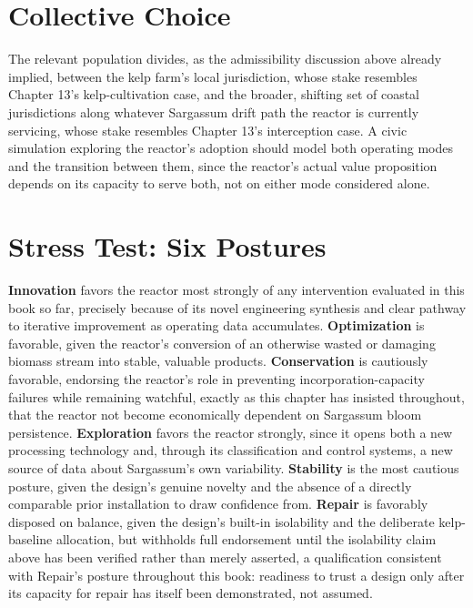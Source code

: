 \documentclass[11pt,oneside]{book}
\begin{document}
\section*{Collective Choice}

The relevant population divides, as the admissibility discussion above already implied, between the kelp farm's local jurisdiction, whose stake resembles Chapter 13's kelp-cultivation case, and the broader, shifting set of coastal jurisdictions along whatever Sargassum drift path the reactor is currently servicing, whose stake resembles Chapter 13's interception case. A civic simulation exploring the reactor's adoption should model both operating modes and the transition between them, since the reactor's actual value proposition depends on its capacity to serve both, not on either mode considered alone.

\section*{Stress Test: Six Postures}

\textbf{Innovation} favors the reactor most strongly of any intervention evaluated in this book so far, precisely because of its novel engineering synthesis and clear pathway to iterative improvement as operating data accumulates. \textbf{Optimization} is favorable, given the reactor's conversion of an otherwise wasted or damaging biomass stream into stable, valuable products. \textbf{Conservation} is cautiously favorable, endorsing the reactor's role in preventing incorporation-capacity failures while remaining watchful, exactly as this chapter has insisted throughout, that the reactor not become economically dependent on Sargassum bloom persistence. \textbf{Exploration} favors the reactor strongly, since it opens both a new processing technology and, through its classification and control systems, a new source of data about Sargassum's own variability. \textbf{Stability} is the most cautious posture, given the design's genuine novelty and the absence of a directly comparable prior installation to draw confidence from. \textbf{Repair} is favorably disposed on balance, given the design's built-in isolability and the deliberate kelp-baseline allocation, but withholds full endorsement until the isolability claim above has been verified rather than merely asserted, a qualification consistent with Repair's posture throughout this book: readiness to trust a design only after its capacity for repair has itself been demonstrated, not assumed.
\end{document}
